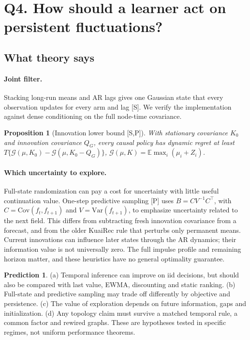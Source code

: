 \documentclass[11pt]{article}
\newtheorem{proposition}[theorem]{Proposition}
\theoremstyle{definition}
\newtheorem{prediction}{Prediction}
\theoremstyle{remark}
\newcommand{\E}{\mathbb{E}}
\newcommand{\Var}{\mathrm{Var}}
\newcommand{\Cov}{\mathrm{Cov}}
\newcommand{\src}[1]{\textsf{[#1]}}
\begin{document}
\section{Q4. How should a learner act on persistent fluctuations?}\label{sec:q4}

\subsection{What theory says}

\paragraph{Joint filter.} Stacking long-run means and AR lags gives one Gaussian state that every observation updates for every arm and lag \src{S}. We verify the implementation against dense conditioning on the full node-time covariance.

\begin{proposition}[Innovation lower bound \src{S,P}]\label{prop:floor}
With stationary covariance $K_0$ and innovation covariance $Q_G$, every causal policy has dynamic regret at least $T\{\mathcal G(\mu,K_0)-\mathcal G(\mu,K_0-Q_G)\}$, $\mathcal G(\mu,K)=\E\max_i(\mu_i+Z_i)$.
\end{proposition}

\paragraph{Which uncertainty to explore.} Full-state randomization can pay a cost for uncertainty with little useful continuation value. One-step predictive sampling \src{P} uses $B=CV^{-1}C^\top$, with $C=\Cov(f_t,f_{t+1})$ and $V=\Var(f_{t+1})$, to emphasize uncertainty related to the next field. This differs from subtracting fresh innovation covariance from a forecast, and from the older KuaiRec rule that perturbs only permanent means. Current innovations can influence later states through the AR dynamics; their information value is not universally zero. The full impulse profile and remaining horizon matter, and these heuristics have no general optimality guarantee.

\begin{prediction}\label{pred:q4}
(a) Temporal inference can improve on iid decisions, but should also be compared with last value, EWMA, discounting and static ranking. (b) Full-state and predictive sampling may trade off differently by objective and persistence. (c) The value of exploration depends on future information, gaps and initialization. (d) Any topology claim must survive a matched temporal rule, a common factor and rewired graphs. These are hypotheses tested in specific regimes, not uniform performance theorems.
\end{prediction}
\end{document}
